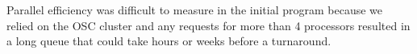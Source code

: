 Parallel efficiency was difficult to measure in the initial program because we relied on the OSC cluster and any requests for more than 4 processors resulted in a long queue that could take hours or weeks before a turnaround.





